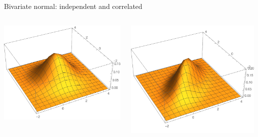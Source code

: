 \begin{frame}{Bivariate normal: independent and correlated}
\begin{columns}
\begin{column}{0.5\textwidth}

	\includegraphics[width=1\textwidth]{joint_normal_ind.pdf}	
\end{column}
\begin{column}{0.5\textwidth}
	\includegraphics[width=1\textwidth]{joint_normal_corr.pdf}	
\end{column}

\end{columns}
	
\end{frame}


